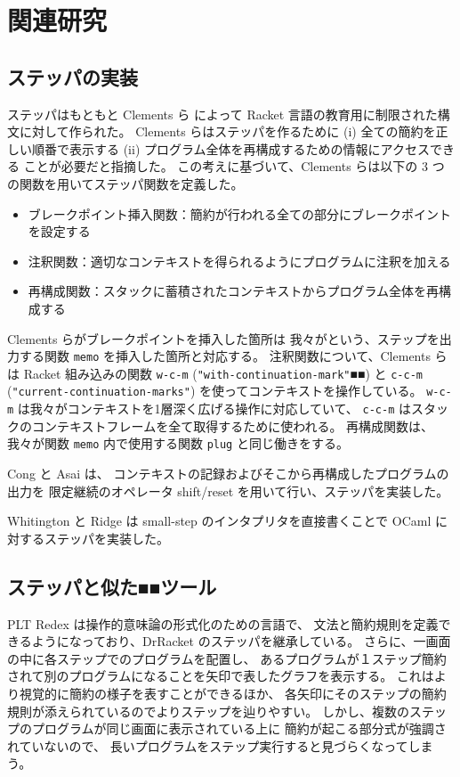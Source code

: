 \chapter{関連研究}
\label{chapter:related}

\section{ステッパの実装}
\label{section:stepper__related}

ステッパはもともと Clements ら \cite{clements01} によって
Racket 言語の教育用に制限された構文に対して作られた。
Clements らはステッパを作るために
(i) 全ての簡約を正しい順番で表示する
(ii) プログラム全体を再構成するための情報にアクセスできる
ことが必要だと指摘した。
この考えに基づいて、Clements らは以下の 3 つの関数を用いてステッパ関数を定義した。
\begin{itemize}
\item ブレークポイント挿入関数：簡約が行われる全ての部分にブレークポイントを設定する
\item 注釈関数：適切なコンテキストを得られるようにプログラムに注釈を加える
\item 再構成関数：スタックに蓄積されたコンテキストからプログラム全体を再構成する
\end{itemize}
Clements らがブレークポイントを挿入した箇所は
我々がという、ステップを出力する関数 \texttt{memo} を挿入した箇所と対応する。
注釈関数について、Clements らは Racket 組み込みの関数
\texttt{w-c-m} (\texttt{"with-continuation-mark"}■■) と
\texttt{c-c-m} (\texttt{"current-continuation-marks"})
を使ってコンテキストを操作している。
\texttt{w-c-m} は我々がコンテキストを1層深く広げる操作に対応していて、
\texttt{c-c-m} はスタックのコンテキストフレームを全て取得するために使われる。
再構成関数は、
我々が関数 \texttt{memo} 内で使用する関数 \texttt{plug} と同じ働きをする。

Cong と Asai \cite{Cong16} は、
コンテキストの記録およびそこから再構成したプログラムの出力を
限定継続のオペレータ shift/reset を用いて行い、ステッパを実装した。

Whitington と Ridge \cite{EPTCS294.3} は
small-step のインタプリタを直接書くことで
OCaml に対するステッパを実装した。

\section{ステッパと似た■■ツール}

PLT Redex \cite{felleisen09}は操作的意味論の形式化のための言語で、
文法と簡約規則を定義できるようになっており、DrRacket のステッパを継承している。
さらに、一画面の中に各ステップでのプログラムを配置し、
あるプログラムが１ステップ簡約されて別のプログラムになることを矢印で表したグラフを表示する。
これはより視覚的に簡約の様子を表すことができるほか、
各矢印にそのステップの簡約規則が添えられているのでよりステップを辿りやすい。
しかし、複数のステップのプログラムが同じ画面に表示されている上に
簡約が起こる部分式が強調されていないので、
長いプログラムをステップ実行すると見づらくなってしまう。

